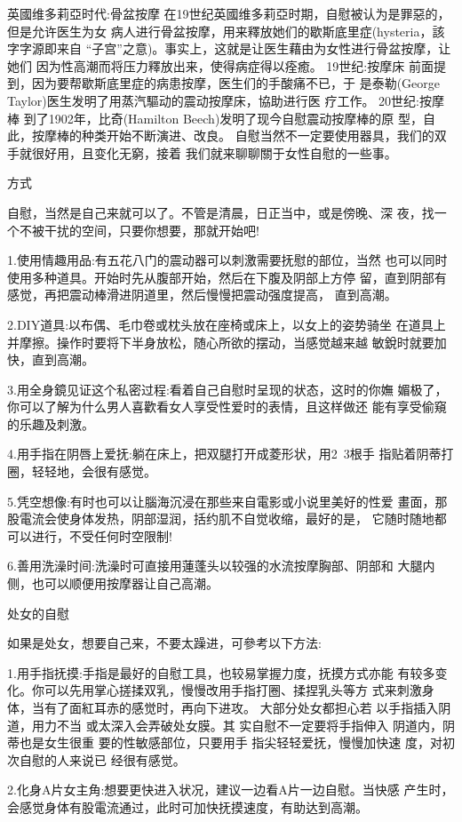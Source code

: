 \documentclass[12pt,UTF8]{ctexbook}
\begin{document}
英國维多莉亞时代:骨盆按摩
在19世纪英國维多莉亞时期，自慰被认为是罪惡的，但是允许医生为女
病人进行骨盆按摩，用来釋放她们的歇斯底里症(hysteria，該字字源即来自
“子宫”之意)。事实上，这就是让医生藉由为女性进行骨盆按摩，让她们
因为性高潮而将压力釋放出来，使得病症得以痊癒。
19世纪:按摩床
前面提到，因为要帮歇斯底里症的病患按摩，医生们的手酸痛不已，于
是泰勒(George Taylor)医生发明了用蒸汽驅动的震动按摩床，協助进行医
疗工作。
20世纪:按摩棒
到了1902年，比奇(Hamilton Beech)发明了现今自慰震动按摩棒的原
型，自此，按摩棒的种类开始不断演进、改良。
自慰当然不一定要使用器具，我们的双手就很好用，且变化无窮，接着
我们就来聊聊關于女性自慰的一些事。

方式

自慰，当然是自己来就可以了。不管是清晨，日正当中，或是傍晚、深
夜，找一个不被干扰的空间，只要你想要，那就开始吧!

1.使用情趣用品:有五花八门的震动器可以刺激需要抚慰的部位，当然
也可以同时使用多种道具。开始时先从腹部开始，然后在下腹及阴部上方停
留，直到阴部有感觉，再把震动棒滑进阴道里，然后慢慢把震动强度提高，
直到高潮。

2.DIY道具:以布偶、毛巾卷或枕头放在座椅或床上，以女上的姿势骑坐
在道具上并摩擦。操作时要将下半身放松，随心所欲的摆动，当感觉越来越
敏銳时就要加快，直到高潮。

3.用全身鏡见证这个私密过程:看着自己自慰时呈现的状态，这时的你嫵
媚极了，你可以了解为什么男人喜歡看女人享受性爱时的表情，且这样做还
能有享受偷窺的乐趣及刺激。

4.用手指在阴唇上爱抚:躺在床上，把双腿打开成菱形状，用2~3根手
指贴着阴蒂打圈，轻轻地，会很有感觉。

5.凭空想像:有时也可以让腦海沉浸在那些来自電影或小说里美好的性爱
畫面，那股電流会使身体发热，阴部湿润，括约肌不自觉收缩，最好的是，
它随时随地都可以进行，不受任何时空限制!

6.善用洗澡时间:洗澡时可直接用蓮蓬头以较强的水流按摩胸部、阴部和
大腿内侧，也可以顺便用按摩器让自己高潮。

处女的自慰

如果是处女，想要自己来，不要太躁进，可參考以下方法:

1.用手指抚摸:手指是最好的自慰工具，也较易掌握力度，抚摸方式亦能
有较多变化。你可以先用掌心搓揉双乳，慢慢改用手指打圈、揉捏乳头等方
式来刺激身体，当有了面紅耳赤的感觉时，再向下进攻。
大部分处女都担心若
以手指插入阴道，用力不当
或太深入会弄破处女膜。其
实自慰不一定要将手指伸入
阴道内，阴蒂也是女生很重
要的性敏感部位，只要用手
指尖轻轻爱抚，慢慢加快速
度，对初次自慰的人来说已
经很有感觉。

2.化身A片女主角:想要更快进入状况，建议一边看A片一边自慰。当快感
产生时，会感觉身体有股電流通过，此时可加快抚摸速度，有助达到高潮。
\end{document}
